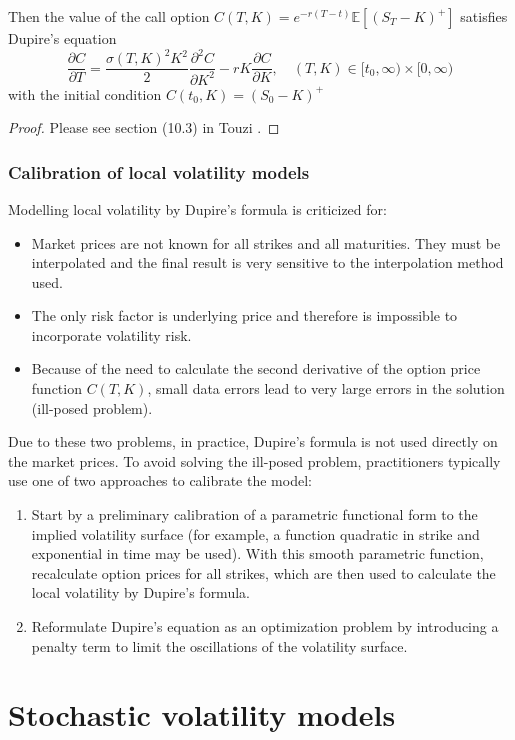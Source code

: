 \documentclass[10pt]{article}
\theoremstyle{plain}
\numberwithin{equation}{section}
\numberwithin{table}{section}
\newcommand{\s}{\sigma}
\newcommand{\pa}{\partial}
\newcommand{\E}{\mathbb{E}}
\begin{document}
Then the value of the call option $C(T, K)=e^{-r(T-t)}\E [(S_T - K)^{+}]$ satisfies Dupire's equation
\[
    \frac{\pa C}{\pa T} = \frac{\s(T,K)^2 K^2}{2} \frac{\pa^2 C}{\pa K^2} - rK\frac{\pa C}{\pa K} ,  \quad (T,K) \in [t_0, \infty) \times [0, \infty) 
\] 
with the initial condition $C(t_0, K) = (S_0 - K)^+$

\begin{proof}
 Please see section (10.3) in Touzi \cite{Touzi}. 
\end{proof}


\subsubsection{Calibration of local volatility models}
Modelling local volatility by Dupire's formula is criticized for: 
\begin{itemize}
    \item Market prices are not known for all strikes and all maturities. They must
    be interpolated and the final result is very sensitive to the interpolation
    method used.
    \item The only risk factor is underlying price and therefore is impossible to incorporate 
    volatility risk.
    \item Because of the need to calculate the second derivative of the option price
    function $C(T, K)$, small data errors lead to very large errors in the solution
    (ill-posed problem).
\end{itemize}

Due to these two problems, in practice, Dupire's formula is not used directly
on the market prices. To avoid solving the ill-posed problem, practitioners
typically use one of two approaches to calibrate the model:
\begin{enumerate}
    \item Start by a preliminary calibration of a parametric functional form to the
    implied volatility surface (for example, a function quadratic in strike and
    exponential in time may be used). With this smooth parametric function,
    recalculate option prices for all strikes, which are then used to calculate
    the local volatility by Dupire's formula.
    \item Reformulate Dupire's equation as an optimization problem by introducing
    a penalty term to limit the oscillations of the volatility surface.
\end{enumerate}


\section{Stochastic volatility models}
\end{document}
